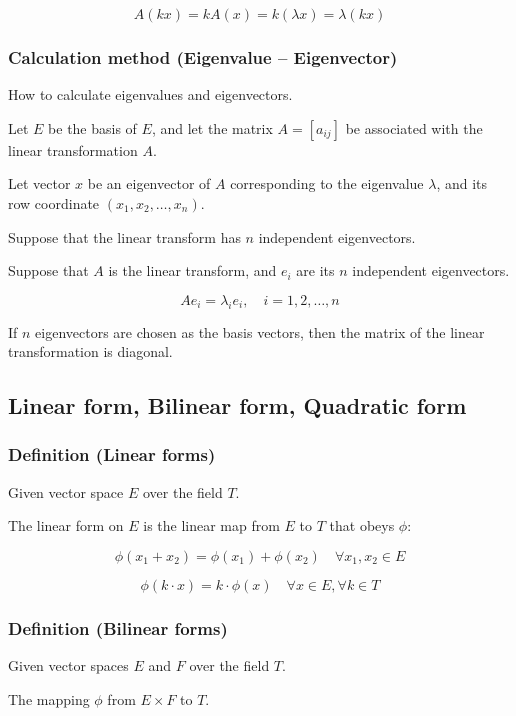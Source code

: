 \[
A(k x) = k A(x) = k (\lambda x) = \lambda (k x)
\]

\subsubsection{Calculation method (Eigenvalue – Eigenvector)}

How to calculate eigenvalues and eigenvectors.

Let $E$ be the basis of $E$, and let the matrix $A = [a_{ij}]$ be associated with the linear transformation $A$.

Let vector $x$ be an eigenvector of $A$ corresponding to the eigenvalue $\lambda$, and its row coordinate $(x_1, x_2, \ldots, x_n)$.

Suppose that the linear transform has $n$ independent eigenvectors.

Suppose that $A$ is the linear transform, and $e_i$ are its $n$ independent eigenvectors.

\[
A e_i = \lambda_i e_i, \quad i = 1, 2, \ldots, n
\]

If $n$ eigenvectors are chosen as the basis vectors, then the matrix of the linear transformation is diagonal.



\subsection{Linear form, Bilinear form, Quadratic form}
\subsubsection{Definition (Linear forms)}

Given vector space $E$ over the field $T$.

The linear form on $E$ is the linear map from $E$ to $T$ that obeys $\phi$:

\[
\phi(x_1 + x_2) = \phi(x_1) + \phi(x_2) \quad \forall x_1, x_2 \in E
\]

\[
\phi(k \cdot x) = k \cdot \phi(x) \quad \forall x \in E, \forall k \in T
\]

\subsubsection{Definition (Bilinear forms)}

Given vector spaces $E$ and $F$ over the field $T$.

The mapping $\phi$ from $E \times F$ to $T$.

